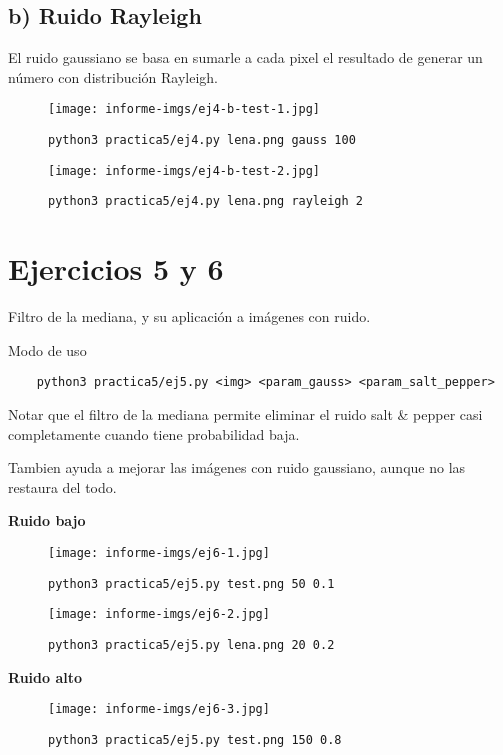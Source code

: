 \documentclass[11pt, spanish]{article}
\begin{document}
\subsection{b) Ruido Rayleigh}

El ruido gaussiano se basa en sumarle a cada pixel el resultado de generar un número con distribución Rayleigh.

\begin{figure}[H]
\centering
  \texttt{[image: informe-imgs/ej4-b-test-1.jpg]}
  \caption{\texttt{python3 practica5/ej4.py lena.png gauss 100}}
\end{figure}

\begin{figure}[H]
\centering
  \texttt{[image: informe-imgs/ej4-b-test-2.jpg]}
  \caption{\texttt{python3 practica5/ej4.py lena.png rayleigh 2}}
\end{figure}

\newpage
\section{Ejercicios 5 y 6}

Filtro de la mediana, y su aplicación a imágenes con ruido.

Modo de uso
\begin{verbatim}
    python3 practica5/ej5.py <img> <param_gauss> <param_salt_pepper>
\end{verbatim}

Notar que el filtro de la mediana permite eliminar el ruido salt \& pepper casi completamente cuando
tiene probabilidad baja.

Tambien ayuda a mejorar las imágenes con ruido gaussiano, aunque no las restaura del todo.


\textbf{Ruido bajo}

\begin{figure}[H]
\centering
  \texttt{[image: informe-imgs/ej6-1.jpg]}
  \caption{\texttt{python3 practica5/ej5.py test.png 50 0.1}}
\end{figure}

\begin{figure}[H]
\centering
  \texttt{[image: informe-imgs/ej6-2.jpg]}
  \caption{\texttt{python3 practica5/ej5.py lena.png 20 0.2}}
\end{figure}

\textbf{Ruido alto}

\begin{figure}[H]
\centering
  \texttt{[image: informe-imgs/ej6-3.jpg]}
  \caption{\texttt{python3 practica5/ej5.py test.png 150 0.8}}
\end{figure}
\end{document}
